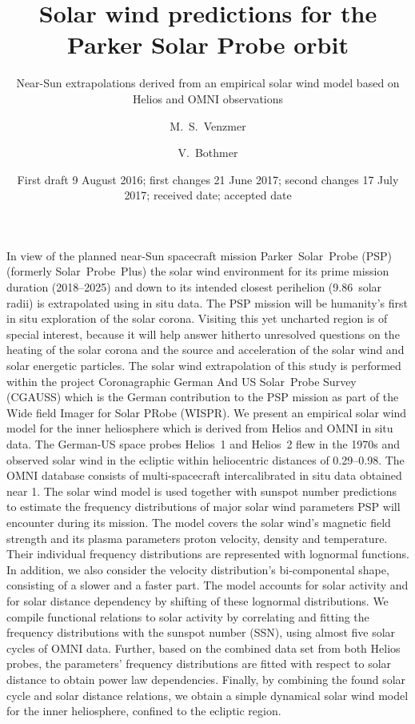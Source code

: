 
\title{Solar wind predictions for the Parker Solar Probe orbit}
\subtitle{Near-Sun extrapolations derived from an empirical solar wind model based on Helios and OMNI observations}

\author{M.~S.~Venzmer
\and V.~Bothmer}


\date{First draft 9 August 2016; first changes 21 June 2017; second changes 17 July 2017; received date; accepted date}

\abstract
{In view of the planned near-Sun spacecraft mission Parker~Solar~Probe (PSP) (formerly Solar~Probe~Plus) the solar wind environment for its prime mission duration (2018--2025) and down to its intended closest perihelion (\num{9.86}~solar radii) is extrapolated using in situ data. The PSP mission will be humanity's first in situ exploration of the solar corona. Visiting this yet uncharted region is of special interest, because it will help answer hitherto unresolved questions on the heating of the solar corona and the source and acceleration of the solar wind and solar energetic particles. The solar wind extrapolation of this study is performed within the project Coronagraphic German And US Solar~Probe Survey (CGAUSS) which is the German contribution to the PSP mission as part of the Wide field Imager for Solar PRobe (WISPR).}	%
{We present an empirical solar wind model for the inner heliosphere which is derived from Helios and OMNI in situ data. The German-US space probes Helios~1 and Helios~2 flew in the 1970s and observed solar wind in the ecliptic within heliocentric distances of \SIrange{0.29}{0.98}{\au}. The OMNI database consists of multi-spacecraft intercalibrated in situ data obtained near \SI{1}{\au}. The solar wind model is used together with sunspot number predictions to estimate the frequency distributions of major solar wind parameters PSP will encounter during its mission.}	%
{The model covers the solar wind's magnetic field strength and its plasma parameters proton velocity, density and temperature.
Their individual frequency distributions are represented with lognormal functions. In addition, we also consider the velocity distribution's bi-componental shape, consisting of a slower and a faster part. The model accounts for solar activity and for solar distance dependency by shifting of these lognormal distributions. We compile functional relations to solar activity by correlating and fitting the frequency distributions with the sunspot number (SSN), using almost five solar cycles of OMNI data. Further, based on the combined data set from both Helios probes, the parameters' frequency distributions are fitted with respect to solar distance to obtain power law dependencies. Finally, by combining the found solar cycle and solar distance relations, we obtain a simple dynamical solar wind model for the inner heliosphere, confined to the ecliptic region.}	%
